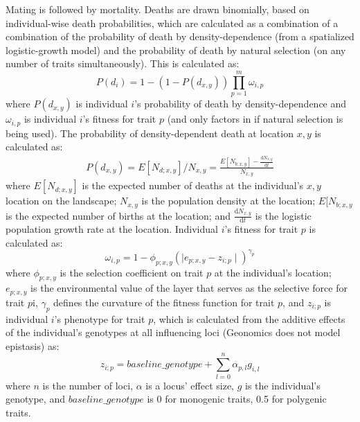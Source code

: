 ﻿\documentclass{article}
\begin{document}
Mating is followed by mortality. Deaths are drawn binomially, based on 
individual-wise death probabilities, which are calculated as a combination of
a combination of the probability of death by density-dependence (from a spatialized logistic-growth model)
and the probability of death by natural selection (on any number of traits simultaneously). 
This is calculated as:
\begin{equation}
P(d_{i}) = 1 - (1 - P(d_{x,y})) \prod_{p = 1}^{m}\omega_{i,p}
\end{equation}
where $P(d_{x,y})$ is individual $i$'s probability of death by density-dependence
and $\omega_{i,p}$ is individual $i$'s fitness for trait $p$
(and only factors in if natural selection is being used).
The probability of density-dependent death at location $x,y$ is calculated as:
\begin{equation}
\begin{split}
       P(d_{x,y}) = E[N_{d;x,y}]/N_{x,y} = \frac{E[N_{b;x,y}] - \frac{\mathrm{d}N_{x,y}}{\mathrm{d}t}}{N_{x,y}}
\end{split}
\end{equation}
where $E[N_{d;x,y}]$ is the expected number of deaths at the individual's $x,y$ location on the landscape;
$N_{x,y}$ is the population density at the location;
$E[N_{b;x,y}$ is the expected number of births at the location;
and $\frac{\mathrm{d}N_{x,y}}{\mathrm{d}t}$ is the logistic population growth rate at the location.
Individual $i$'s fitness for trait $p$ is calculated as:
\begin{equation}
\omega_{i,p}= 1 - \phi_{p;x,y} {( \mid e_{p;x,y} - z_{i;p} \mid )}^{\gamma_{p}}
\end{equation}
where $\phi_{p;x,y}$ is the selection coefficient on trait $p$ at the
individual's location; $e_{p;x,y}$ is the environmental value
of the layer that serves as the selective force for trait $p$i,
$\gamma_{p}$ defines the curvature of the fitness function for trait $p$,
and $z_{i;p}$ is individual $i$'s phenotype for trait $p$, which is calculated
from the additive effects of the individual's genotypes at all influencing loci
(Geonomics does not model epistasis) as:
\begin{equation}
z_{i;p} = baseline\_genotype + \sum_{l = 0}^{n} \alpha_{p,l} g_{i,l}
\end{equation}
where $n$ is the number of loci, $\alpha$ is a locus' effect size, $g$ is the
individual's genotype, and $baseline\_genotype$ is 0 for monogenic traits,
0.5 for polygenic traits. 
\end{document}
